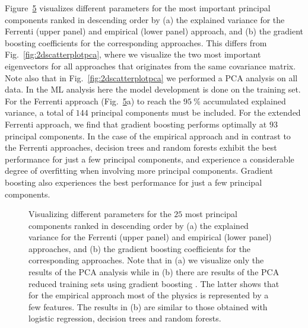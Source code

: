 \documentclass[superscriptaddress,unsortedaddress,
 amsmath,amssymb,
 aps,
]{revtex4-2}
\begin{document}
Figure~\ref{fig:PComponents} visualizes different parameters for the most important principal components ranked in descending order by (a) the explained variance for the Ferrenti (upper panel) and empirical (lower panel) approach, and (b) the gradient boosting coefficients for the corresponding approaches. This differs from Fig.~\ref{fig:2dscatterplotpca}, where we visualize the two most important eigenvectors for all approaches that originates from the same covariance matrix. Note also that in  Fig.~\ref{fig:2dscatterplotpca} we performed a PCA analysis on all data. In the ML analysis here the model development is done on the training set. For the Ferrenti approach (Fig.~\ref{fig:PComponents}a) to reach the $95 \ \%$ accumulated explained variance, a total of $144$ principal components must be included. For the extended Ferrenti approach, we find that gradient boosting performs optimally at $93$ principal components. 
%
In the case of the empirical approach and in contrast to the Ferrenti approaches, decision trees and random forests exhibit the best performance for just a few principal components, and experience a considerable degree of overfitting when involving more principal components. Gradient boosting 
also experiences the best performance for just a few principal components. 

\begin{figure}[t]
    \centering
    \begin{subfigure}[b]{0.45\textwidth}
        
        \label{fig:01-fi-e}
    \end{subfigure}
    \begin{subfigure}[b]{0.45\textwidth}
        
        \label{fig:01-fi-d}
    \end{subfigure}%
    \hfill
    \begin{subfigure}[b]{0.45\textwidth}
        
        \label{fig:03-fi-e}
        \subcaption{}
    \end{subfigure}
    \begin{subfigure}[b]{0.45\textwidth}
        
        \label{fig:03-fi-d}
        \subcaption{}
    \end{subfigure}
    \caption{Visualizing different parameters for the $25$ most principal components ranked in descending order by (a) the explained variance for the Ferrenti (upper panel) and empirical (lower panel) approaches, and (b) the gradient boosting coefficients for the corresponding approaches. Note that in (a) we visualize only the results of the PCA analysis while in (b) there are results of the PCA reduced training sets using gradient boosting \cite{Hastie2009,xgboost2016}. The latter shows that for the empirical approach most of the physics is represented by a few features. The results in (b) are similar to those obtained with logistic regression, decision trees and random forests.  
    }
    \label{fig:PComponents}
\end{figure}
\end{document}
